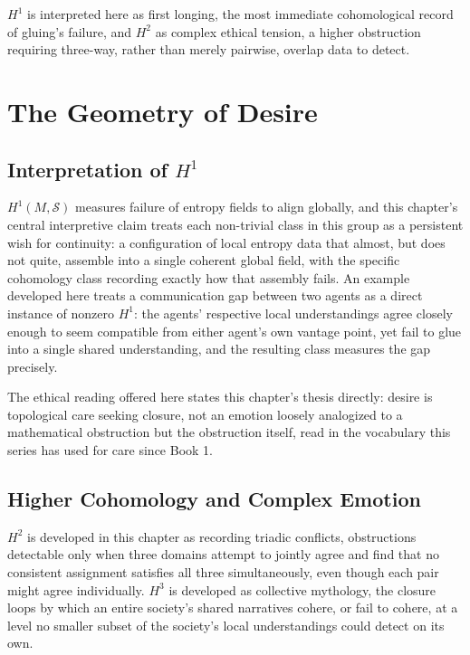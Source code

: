 $H^1$ is interpreted here as first longing, the most immediate cohomological record of gluing's failure, and $H^2$ as complex ethical tension, a higher obstruction requiring three-way, rather than merely pairwise, overlap data to detect.

\part{The Geometry of Desire}

\chapter{Interpretation of $H^1$}

$H^1(M, \mathcal{S})$ measures failure of entropy fields to align globally, and this chapter's central interpretive claim treats each non-trivial class in this group as a persistent wish for continuity: a configuration of local entropy data that almost, but does not quite, assemble into a single coherent global field, with the specific cohomology class recording exactly how that assembly fails. An example developed here treats a communication gap between two agents as a direct instance of nonzero $H^1$: the agents' respective local understandings agree closely enough to seem compatible from either agent's own vantage point, yet fail to glue into a single shared understanding, and the resulting class measures the gap precisely.

The ethical reading offered here states this chapter's thesis directly: desire is topological care seeking closure, not an emotion loosely analogized to a mathematical obstruction but the obstruction itself, read in the vocabulary this series has used for care since Book 1.

\chapter{Higher Cohomology and Complex Emotion}

$H^2$ is developed in this chapter as recording triadic conflicts, obstructions detectable only when three domains attempt to jointly agree and find that no consistent assignment satisfies all three simultaneously, even though each pair might agree individually. $H^3$ is developed as collective mythology, the closure loops by which an entire society's shared narratives cohere, or fail to cohere, at a level no smaller subset of the society's local understandings could detect on its own.

